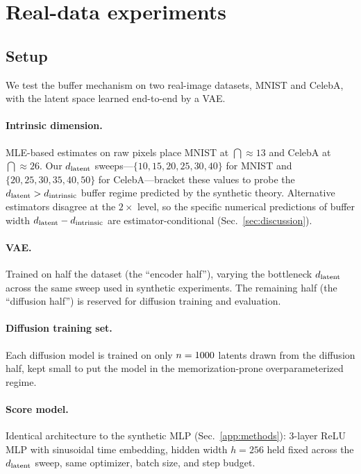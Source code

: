 \section{Real-data experiments}
\label{app:real-data}

\subsection{Setup}
We test the buffer mechanism on two real-image datasets, MNIST and
CelebA, with the latent space learned end-to-end by a VAE.

\paragraph{Intrinsic dimension.} MLE-based estimates on raw pixels
\citep{pope2021} place MNIST at $\dint \approx 13$ and CelebA at
$\dint \approx 26$. Our $d_{\mathrm{latent}}$ sweeps---$\{10, 15, 20, 25, 30, 40\}$
for MNIST and $\{20, 25, 30, 35, 40, 50\}$ for CelebA---bracket these
values to probe the $d_{\mathrm{latent}} > d_{\mathrm{intrinsic}}$ buffer regime predicted by the
synthetic theory. Alternative estimators
\citep{facco2017twonn, stanczuk2024manifold, kamkari2024geometric}
disagree at the $2{\times}$ level, so the specific numerical
predictions of buffer width $d_{\mathrm{latent}} - d_{\mathrm{intrinsic}}$ are
estimator-conditional (Sec.~\ref{sec:discussion}).

\paragraph{VAE.} Trained on half the dataset (the ``encoder half''),
varying the bottleneck $d_{\mathrm{latent}}$ across the same sweep used in
synthetic experiments. The remaining half (the ``diffusion half'')
is reserved for diffusion training and evaluation.

\paragraph{Diffusion training set.} Each diffusion model is trained
on only $n = 1000$ latents drawn from the diffusion half, kept
small to put the model in the memorization-prone overparameterized
regime.

\paragraph{Score model.} Identical architecture to the synthetic
MLP (Sec.~\ref{app:methods}): 3-layer ReLU MLP with sinusoidal time
embedding, hidden width $h = 256$ held fixed across the $d_{\mathrm{latent}}$
sweep, same optimizer, batch size, and step budget.

